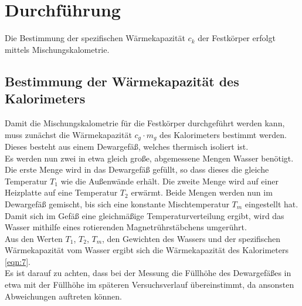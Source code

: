 \section{Durchführung}
\label{sec:Durchfuehrung}

Die Bestimmung der spezifischen Wärmekapazität $c_k$ der Festkörper erfolgt mittels Mischungskalometrie.
\subsection{Bestimmung der Wärmekapazität des Kalorimeters}
Damit die Mischungskalometrie für die Festkörper durchgeführt werden kann, muss zunächst die Wärmekapazität $c_g \cdot m_g$ des Kalorimeters bestimmt werden.
Dieses besteht aus einem Dewargefäß, welches thermisch isoliert ist. \\
Es werden nun zwei in etwa gleich große, abgemessene Mengen Wasser benötigt.
Die erste Menge wird in das Dewargefäß gefüllt, so dass dieses die gleiche Temperatur $T_1$ wie die Außenwände erhält.
Die zweite Menge wird auf einer Heizplatte auf eine Temperatur $T_2$ erwärmt.
Beide Mengen werden nun im Dewargefäß gemischt, bis sich eine konstante Mischtemperatur $T_m$ eingestellt hat.
Damit sich im Gefäß eine gleichmäßige Temperaturverteilung ergibt, wird das Wasser mithilfe eines rotierenden Magnetrührstäbchens umgerührt. \\
Aus den Werten $T_1$, $T_2$, $T_m$, den Gewichten des Wassers und der spezifischen Wärmekapazität vom Wasser ergibt sich die Wärmekapazität des Kalorimeters \ref{eqn:7}. \\
Es ist darauf zu achten, dass bei der Messung die Füllhöhe des Dewargefäßes in etwa mit der Füllhöhe im späteren Versuchsverlauf übereinstimmt, da ansonsten Abweichungen auftreten können.

